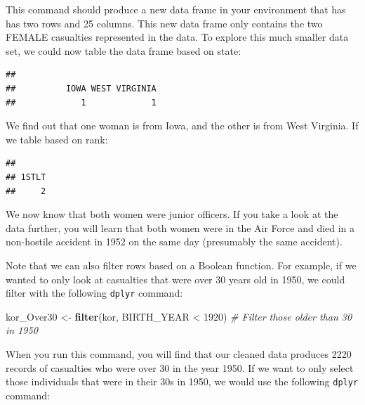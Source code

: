 \documentclass[]{book}
\newenvironment{Shaded}{\begin{snugshade}}{\end{snugshade}}
\newcommand{\KeywordTok}[1]{\textcolor[rgb]{0.13,0.29,0.53}{\textbf{{#1}}}}
\newcommand{\DecValTok}[1]{\textcolor[rgb]{0.00,0.00,0.81}{{#1}}}
\newcommand{\StringTok}[1]{\textcolor[rgb]{0.31,0.60,0.02}{{#1}}}
\newcommand{\CommentTok}[1]{\textcolor[rgb]{0.56,0.35,0.01}{\textit{{#1}}}}
\newcommand{\NormalTok}[1]{{#1}}
\begin{document}
This command should produce a new data frame in your environment that
has has two rows and 25 columns. This new data frame only contains the
two FEMALE casualties represented in the data. To explore this much
smaller data set, we could now table the data frame based on state:

\begin{Shaded}
\end{Shaded}

\begin{verbatim}
## 
##          IOWA WEST VIRGINIA 
##             1             1
\end{verbatim}

We find out that one woman is from Iowa, and the other is from West
Virginia. If we table based on rank:

\begin{Shaded}
\end{Shaded}

\begin{verbatim}
## 
## 1STLT 
##     2
\end{verbatim}

We now know that both women were junior officers. If you take a look at
the data further, you will learn that both women were in the Air Force
and died in a non-hostile accident in 1952 on the same day (presumably
the same accident).

Note that we can also filter rows based on a Boolean function. For
example, if we wanted to only look at casualties that were over 30 years
old in 1950, we could filter with the following \texttt{dplyr} command:

\begin{Shaded}
\begin{Highlighting}[]
\NormalTok{kor_Over30 <-}\StringTok{ }\KeywordTok{filter}\NormalTok{(kor, BIRTH_YEAR <}\StringTok{ }\DecValTok{1920}\NormalTok{)  }\CommentTok{# Filter those older than 30 in 1950}
\end{Highlighting}
\end{Shaded}

When you run this command, you will find that our cleaned data produces
2220 records of casualties who were over 30 in the year 1950. If we want
to only select those individuals that were in their 30s in 1950, we
would use the following \texttt{dplyr} command:
\end{document}
